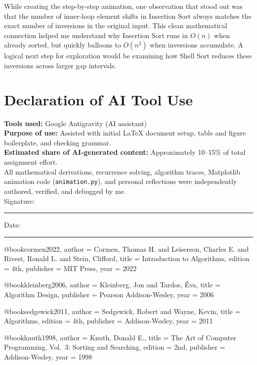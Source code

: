 \documentclass[11pt,a4paper]{article}
\begin{document}
While creating the step-by-step animation, one observation that stood out was that the number of inner-loop element shifts in Insertion Sort always matches the exact number of inversions in the original input. This clean mathematical connection helped me understand why Insertion Sort runs in $O(n)$ when already sorted, but quickly balloons to $O(n^2)$ when inversions accumulate. A logical next step for exploration would be examining how Shell Sort reduces these inversions across larger gap intervals.

\section*{Declaration of AI Tool Use}

\noindent\textbf{Tools used:} Google Antigravity (AI assistant)\\
\textbf{Purpose of use:} Assisted with initial LaTeX document setup, table and figure boilerplate, and checking grammar.\\
\textbf{Estimated share of AI-generated content:} Approximately 10--15\% of total assignment effort.\\[4pt]
All mathematical derivations, recurrence solving, algorithm traces, Matplotlib animation code (\texttt{animation.py}), and personal reflections were independently authored, verified, and debugged by me.\\[14pt]
Signature: \rule{4cm}{0.4pt} \hfill Date: \rule{3cm}{0.4pt}



@book{cormen2022,
  author    = {Cormen, Thomas H. and Leiserson, Charles E. and Rivest, Ronald L. and Stein, Clifford},
  title     = {Introduction to Algorithms},
  edition   = {4th},
  publisher = {MIT Press},
  year      = {2022}
}

@book{kleinberg2006,
  author    = {Kleinberg, Jon and Tardos, {\'E}va},
  title     = {Algorithm Design},
  publisher = {Pearson Addison-Wesley},
  year      = {2006}
}

@book{sedgewick2011,
  author    = {Sedgewick, Robert and Wayne, Kevin},
  title     = {Algorithms},
  edition   = {4th},
  publisher = {Addison-Wesley},
  year      = {2011}
}

@book{knuth1998,
  author    = {Knuth, Donald E.},
  title     = {The Art of Computer Programming, Vol.~3: Sorting and Searching},
  edition   = {2nd},
  publisher = {Addison-Wesley},
  year      = {1998}
}
\end{document}
